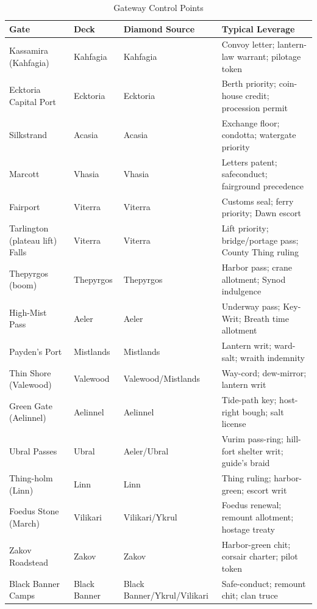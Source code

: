 \documentclass[11pt,letterpaper,twoside]{book}
\begin{document}
\begin{table}[htbp]
\centering
\begin{tabular}{llll}
\toprule
\textbf{Gate} & \textbf{Deck} & \textbf{Diamond Source} & \textbf{Typical Leverage} \\
\midrule
Kassamira (Kahfagia) & Kahfagia & Kahfagia & Convoy letter; lantern-law warrant; pilotage token \\
Ecktoria Capital Port & Ecktoria & Ecktoria & Berth priority; coin-house credit; procession permit \\
Silkstrand & Acasia & Acasia & Exchange floor; condotta; watergate priority \\
Marcott & Vhasia & Vhasia & Letters patent; safeconduct; fairground precedence \\
Fairport & Viterra & Viterra & Customs seal; ferry priority; Dawn escort \\
Tarlington (plateau lift) Falls & Viterra & Viterra & Lift priority; bridge/portage pass; County Thing ruling \\
Thepyrgos (boom) & Thepyrgos & Thepyrgos & Harbor pass; crane allotment; Synod indulgence \\
High-Mist Pass & Aeler & Aeler & Underway pass; Key-Writ; Breath time allotment \\
Payden's Port & Mistlands & Mistlands & Lantern writ; ward-salt; wraith indemnity \\
Thin Shore (Valewood) & Valewood & Valewood/Mistlands & Way-cord; dew-mirror; lantern writ \\
Green Gate (Aelinnel) & Aelinnel & Aelinnel & Tide-path key; host-right bough; salt license \\
Ubral Passes & Ubral & Aeler/Ubral & Vurim pass-ring; hill-fort shelter writ; guide's braid \\
Thing-holm (Linn) & Linn & Linn & Thing ruling; harbor-green; escort writ \\
Foedus Stone (March) & Vilikari & Vilikari/Ykrul & Foedus renewal; remount allotment; hostage treaty \\
Zakov Roadstead & Zakov & Zakov & Harbor-green chit; corsair charter; pilot token \\
Black Banner Camps & Black Banner & Black Banner/Ykrul/Vilikari & Safe-conduct; remount chit; clan truce \\
\bottomrule
\end{tabular}
\caption{Gateway Control Points}
\end{table}

\end{document}
